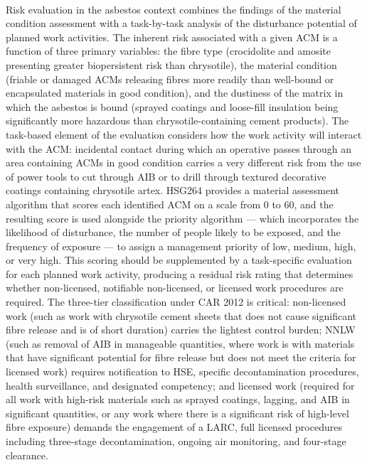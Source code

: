 \paragraph{}
Risk evaluation in the asbestos context combines the findings of the material condition assessment with a task-by-task analysis of the disturbance potential of planned work activities. The inherent risk associated with a given ACM is a function of three primary variables: the fibre type (crocidolite and amosite presenting greater biopersistent risk than chrysotile), the material condition (friable or damaged ACMs releasing fibres more readily than well-bound or encapsulated materials in good condition), and the dustiness of the matrix in which the asbestos is bound (sprayed coatings and loose-fill insulation being significantly more hazardous than chrysotile-containing cement products). The task-based element of the evaluation considers how the work activity will interact with the ACM: incidental contact during which an operative passes through an area containing ACMs in good condition carries a very different risk from the use of power tools to cut through AIB or to drill through textured decorative coatings containing chrysotile artex. HSG264 provides a material assessment algorithm that scores each identified ACM on a scale from 0 to 60, and the resulting score is used alongside the priority algorithm — which incorporates the likelihood of disturbance, the number of people likely to be exposed, and the frequency of exposure — to assign a management priority of low, medium, high, or very high. This scoring should be supplemented by a task-specific evaluation for each planned work activity, producing a residual risk rating that determines whether non-licensed, notifiable non-licensed, or licensed work procedures are required. The three-tier classification under CAR 2012 is critical: non-licensed work (such as work with chrysotile cement sheets that does not cause significant fibre release and is of short duration) carries the lightest control burden; NNLW (such as removal of AIB in manageable quantities, where work is with materials that have significant potential for fibre release but does not meet the criteria for licensed work) requires notification to HSE, specific decontamination procedures, health surveillance, and designated competency; and licensed work (required for all work with high-risk materials such as sprayed coatings, lagging, and AIB in significant quantities, or any work where there is a significant risk of high-level fibre exposure) demands the engagement of a LARC, full licensed procedures including three-stage decontamination, ongoing air monitoring, and four-stage clearance.

